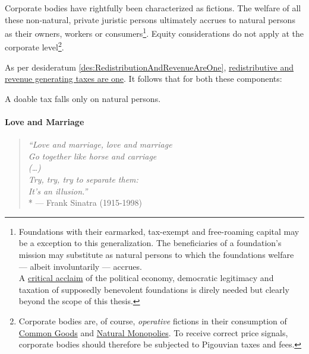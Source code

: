 
Corporate bodies have rightfully been characterized as fictions.
 The welfare of all these non-natural, private juristic persons ultimately accrues to natural persons as their owners, workers or consumers\footnote{
	Foundations with their earmarked, tax-exempt and free-roaming capital may be a exception to this generalization.
The beneficiaries of a foundation's mission may substitute as natural persons to which the foundations welfare --- albeit involuntarily --- accrues.\\A \href{http://maxheld.de/2010/03/27/foundations-may-be-bad/}{critical acclaim} of the political economy, democratic legitimacy and taxation of supposedly benevolent foundations is direly needed but clearly beyond the scope of this thesis.}.
Equity considerations do not apply at the corporate level\footnote{
	Corporate bodies are, of course, \emph{operative} fictions in their consumption of \href{sec:CommonGood}{Common Goods} and \href{sec:NaturalMonopolies}{Natural Monopolies}.
To receive correct price signals, corporate bodies should therefore be subjected to Pigouvian taxes and fees.}.

As per desideratum \ref{des:RedistributionAndRevenueAreOne}, \hyperref[des:RedistributionAndRevenueAreOne]{redistributive and revenue generating taxes are one}.
It follows that for both these components:

\begin{desideratum}
	A doable tax falls only on natural persons.
	\label{des:PersonalTaxation}
\end{desideratum}

\paragraph{Love and Marriage}
	\label{sec:love-marriage}

\begin{verse}
	\emph{``Love and marriage, love and marriage\\
	Go together like horse and carriage\\
	(\ldots)\\
	Try, try, try to separate them:\\
	It's an illusion.''}\\*
	--- Frank Sinatra (1915-1998)
\end{verse}

